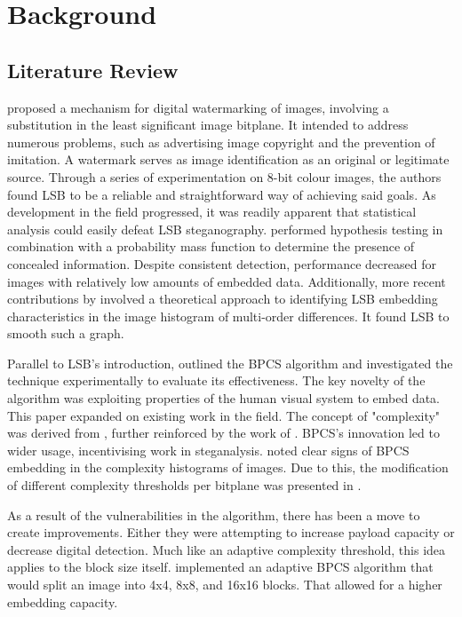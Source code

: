 \documentclass{l4proj}
\begin{document}
\chapter{Background} \label{Background}

\section{Literature Review}

\citet{Schyndel1994ADW} proposed a mechanism for digital watermarking of images, involving a substitution in the least significant image bitplane.  It intended to address numerous problems, such as advertising image copyright and the prevention of imitation. A watermark serves as image identification as an original or legitimate source. Through a series of experimentation on 8-bit colour images, the authors found LSB to be a reliable and straightforward way of achieving said goals. As development in the field progressed, it was readily apparent that statistical analysis could easily defeat LSB steganography.  \citet{1337281} performed hypothesis testing in combination with a probability mass function to determine the presence of concealed information. Despite consistent detection, performance decreased for images with relatively low amounts of embedded data. Additionally, more recent contributions by \cite{https://doi.org/10.1002/sec.864} involved a theoretical approach to identifying LSB embedding characteristics in the image histogram of multi-order differences. It found LSB to smooth such a graph.

Parallel to LSB's introduction, \citet{Kawaguchi1999PrinciplesAA} outlined the BPCS algorithm and investigated the technique experimentally to evaluate its effectiveness. The key novelty of the algorithm was exploiting properties of the human visual system to embed data. This paper expanded on existing work in the field. The concept of "complexity" was derived from \citet{0e8da7e9d1d74bc291f3f5edeb11d513}, further reinforced by the work of \citet{kawaguchi1997modeling}. BPCS's innovation led to wider usage, incentivising work in steganalysis. \citet{shuozhong2005statistical} noted clear signs of BPCS embedding in the complexity histograms of images. Due to this, the modification of different complexity thresholds per bitplane was presented in \citet{sun_2015}.

As a result of the vulnerabilities in the algorithm, there has been a move to create improvements. Either they were attempting to increase payload capacity or decrease digital detection. Much like an adaptive complexity threshold, this idea applies to the block size itself. \citet{Patel2014ImageSS} implemented an adaptive BPCS algorithm that would split an image into 4x4, 8x8, and 16x16 blocks. That allowed for a higher embedding capacity. 
\end{document}
